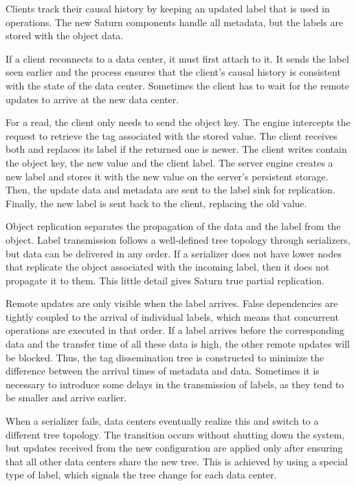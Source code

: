 Clients track their causal history by keeping an updated label that is used in operations. The new Saturn components handle all metadata, but the labels are stored with the object data. 

If a client reconnects to a data center, it must first attach to it. It sends the label seen earlier and the process ensures that the client's causal history is consistent with the state of the data center. Sometimes the client has to wait for the remote updates to arrive at the new data center. 

For a read, the  client only needs to send the object key. The engine intercepts the request to retrieve the tag associated with the stored value. The client receives both and replaces its label if the returned one is newer. The client writes contain the object key, the new value and the client label. The server engine creates a new label and stores it with the new value on the server's persistent storage. Then, the update data and metadata are sent to the label sink for replication. Finally, the new label is sent back to the client, replacing the old value. 

Object replication separates the propagation of the data and the label from the object. Label transmission follows a well-defined tree topology through serializers, but data can be delivered in any order. If a serializer does not have lower nodes that replicate the object associated with the incoming label, then it does not propagate it to them. This little detail gives Saturn true partial replication. 

Remote updates are only visible when the label arrives. False dependencies are tightly coupled to the arrival of individual labels, which means that concurrent operations are executed in that order. If a label arrives before the corresponding data and the transfer time of all these data is high, the other remote updates will be blocked. Thus, the tag dissemination tree is constructed to minimize the difference between the arrival times of metadata and data. Sometimes it is necessary to introduce some delays in the transmission of labels, as they tend to be smaller and arrive earlier. 

When a serializer fails, data centers eventually realize this and switch to a different tree topology. The transition occurs without shutting down the system, but updates received from the new configuration are applied only after ensuring that all other data centers share the new tree. This is achieved by using a special type of label, which signals the tree change for each data center. 

